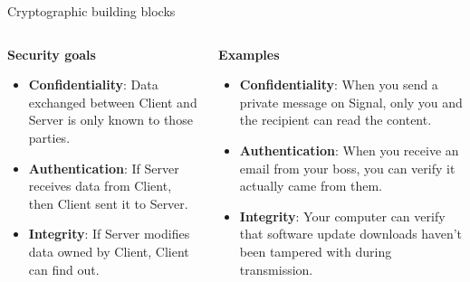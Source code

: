 \documentclass[aspectratio=169, lualatex, handout]{beamer}
\begin{document}
\begin{frame}{Cryptographic building blocks}
	\begin{columns}[c]
		\begin{column}{0.5\textwidth}
			\textbf{Security goals}
			\begin{itemize}[<+->]
				\item \textbf{Confidentiality}: Data exchanged between Client and Server
				      is only known to those parties.
				\item \textbf{Authentication}: If Server receives data from Client,
				      then Client sent it to Server.
				\item \textbf{Integrity}: If Server modifies data owned by Client,
				      Client can find out.
			\end{itemize}
		\end{column}

		\begin{column}{0.5\textwidth}
			\textbf{Examples}
			\begin{itemize}[<+->]
				\item \textbf{Confidentiality}: When you send a private message on Signal,
				      only you and the recipient can read the content.
				\item \textbf{Authentication}: When you receive an email from your boss,
				      you can verify it actually came from them.
				\item \textbf{Integrity}: Your computer can verify that software update
				      downloads haven't been tampered with during transmission.
			\end{itemize}
		\end{column}
	\end{columns}
\end{frame}
\end{document}
